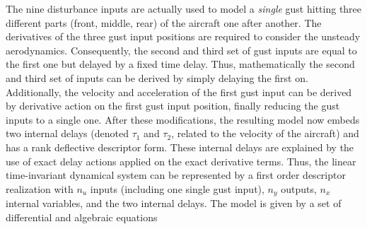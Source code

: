 \documentclass[graybox]{svmult}
\begin{document}
The nine disturbance inputs are  actually used to model a \textit{single} gust hitting  three different parts  (front, middle, rear) of the aircraft one after another. The derivatives of the three gust input positions are required to consider the unsteady aerodynamics. 
Consequently, the second and third set of gust inputs are equal to the first one but delayed by a fixed time delay. Thus, mathematically the second and third set of inputs can be derived by simply delaying the first on. Additionally, the velocity and acceleration of the first gust input can be derived by derivative action on the first gust input position, finally reducing the gust inputs to a single one.
After these modifications, the resulting model now embeds two internal delays (denoted $\tau_1$ and $\tau_2$, related to the velocity of the aircraft) and has a rank deflective descriptor form. These internal delays are explained by the use of exact delay actions applied on the exact derivative terms. Thus, the linear time-invariant dynamical system can be represented by a first order descriptor realization with $n_u$ inputs (including one single gust input), $n_y$ outputs, $n_x$ internal variables, and the two internal delays. The model is given by a set of differential and algebraic equations 
\end{document}
